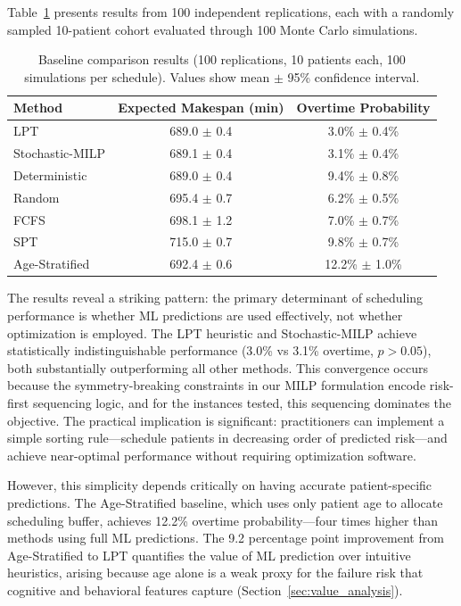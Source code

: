 \documentclass[11pt,a4paper]{article}
\begin{document}
Table~\ref{tab:baseline_results} presents results from 100 independent replications, each with a randomly sampled 10-patient cohort evaluated through 100 Monte Carlo simulations.

\begin{table}[htbp]
\centering
\caption{Baseline comparison results (100 replications, 10 patients each, 100 simulations per schedule). Values show mean $\pm$ 95\% confidence interval.}
\label{tab:baseline_results}
\begin{tabular}{@{}lcc@{}}
\toprule
\textbf{Method} & \textbf{Expected Makespan (min)} & \textbf{Overtime Probability} \\
\midrule
LPT & 689.0 $\pm$ 0.4 & 3.0\% $\pm$ 0.4\% \\
Stochastic-MILP & 689.1 $\pm$ 0.4 & 3.1\% $\pm$ 0.4\% \\
Deterministic & 689.0 $\pm$ 0.4 & 9.4\% $\pm$ 0.8\% \\
Random & 695.4 $\pm$ 0.7 & 6.2\% $\pm$ 0.5\% \\
FCFS & 698.1 $\pm$ 1.2 & 7.0\% $\pm$ 0.7\% \\
SPT & 715.0 $\pm$ 0.7 & 9.8\% $\pm$ 0.7\% \\
Age-Stratified & 692.4 $\pm$ 0.6 & 12.2\% $\pm$ 1.0\% \\
\bottomrule
\end{tabular}
\end{table}

The results reveal a striking pattern: the primary determinant of scheduling performance is whether ML predictions are used effectively, not whether optimization is employed. The LPT heuristic and Stochastic-MILP achieve statistically indistinguishable performance (3.0\% vs 3.1\% overtime, $p > 0.05$), both substantially outperforming all other methods. This convergence occurs because the symmetry-breaking constraints in our MILP formulation encode risk-first sequencing logic, and for the instances tested, this sequencing dominates the objective. The practical implication is significant: practitioners can implement a simple sorting rule---schedule patients in decreasing order of predicted risk---and achieve near-optimal performance without requiring optimization software.

However, this simplicity depends critically on having accurate patient-specific predictions. The Age-Stratified baseline, which uses only patient age to allocate scheduling buffer, achieves 12.2\% overtime probability---four times higher than methods using full ML predictions. The 9.2 percentage point improvement from Age-Stratified to LPT quantifies the value of ML prediction over intuitive heuristics, arising because age alone is a weak proxy for the failure risk that cognitive and behavioral features capture (Section~\ref{sec:value_analysis}).
\end{document}
